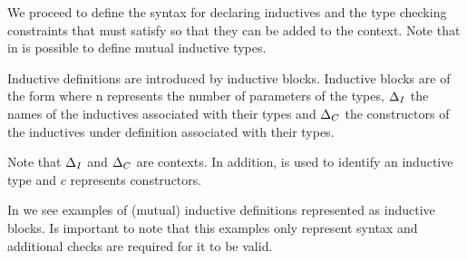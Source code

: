 We proceed to define the syntax for declaring inductives and the type checking constraints that must satisfy 
so that they can be added to the context. Note that in \CIC{} is possible to define mutual inductive types.
\def\IndContextT{\ensuremath{\varContext_{I}}}
\def\IndContextC{\ensuremath{\varContext_{C}}}
\newcommand{\Constr}[2]{\ensuremath{\textsf{Constr}(#1,#2)}}

\begin{Definition}
\label{def:InductiveIntro}
Inductive definitions are introduced by inductive blocks. Inductive blocks
are of the form \IndIntro[n][\IndContextT][\IndContextC]{} where n represents the number of 
parameters of the types, 
\IndContextT{} the names of the inductives associated with their types and \IndContextC{} the constructors
of the inductives under definition associated with their types.
\end{Definition}
\noindent Note that \IndContextT{} and \IndContextC{} are contexts. In addition, \IN{} is used to identify an
inductive type and $c$ represents constructors.

In  we see examples of (mutual) inductive definitions represented as inductive 
blocks. Is important to note that this examples only represent syntax and additional checks are required 
for it to be valid.

